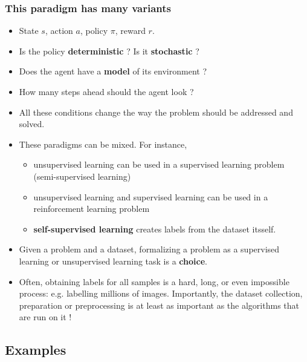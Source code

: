 \documentclass[usenames,dvipsnames]{beamer}
\begin{document}
\begin{frame}
\frametitle{This paradigm has many variants}
\begin{itemize}
	\item 	State $s$, action $a$, policy $\pi$, reward $r$.
	\item	Is the policy \textbf{deterministic }? Is it \textbf{stochastic } ? 
	\item	Does the agent have a \textbf{model} of its environment ? 
	\item	How many steps ahead should the agent look ? 
	\item	All these conditions change the way the problem should be addressed and solved.
\end{itemize}
\end{frame}

\begin{frame}
\begin{itemize}
	\item These paradigms can be mixed. For instance,
	\begin{itemize}
		\item unsupervised learning can be used in a supervised learning problem (semi-supervised learning)
		\item unsupervised learning and supervised learning can be used in a reinforcement learning problem
		\item \textbf{self-supervised learning} creates labels from the dataset itsself. 
	\end{itemize}
	\item Given a problem and a dataset, formalizing a problem as a supervised learning or unsupervised learning task is a \textbf{choice}.
	\item Often, obtaining labels for all samples is a hard, long, or even impossible process: e.g. labelling millions of images. Importantly, the dataset collection, preparation or preprocessing is at least as important as the algorithms that are run on it !
\end{itemize}
\end{frame}

\subsection{Examples}%
\label{sub:examples}
\end{document}
